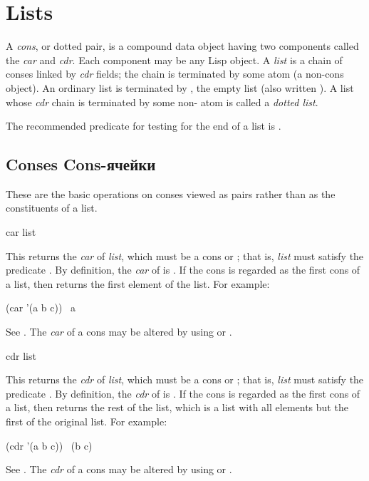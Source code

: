 
\clearpage\def\pagestatus{FINAL PROOF}

\ifx \rulang\Undef

\chapter{Lists}

A \emph{cons}, or dotted pair, is a compound data object having two components
called the \emph{car} and \emph{cdr}.  Each component may be any Lisp object.
A \emph{list} is a chain of conses
linked by \emph{cdr} fields; the chain is terminated by some atom
(a non-cons object).
An ordinary list is terminated by {\nil}, the empty list
(also written {\emptylist}).
A list whose \emph{cdr} chain is terminated by some non-{\nil} atom is called
a \emph{dotted list}.

The recommended predicate for testing for the end of a list is .

\section{Conses Cons-ячейки}

These are the basic operations on conses viewed as pairs rather than
as the constituents of a list.

\begin{defun}[Function]
car list

This returns the \emph{car} of \emph{list}, which must be a cons or {\emptylist};
that is, \emph{list} must satisfy the predicate .
By definition, the \emph{car} of {\emptylist} is {\emptylist}.
If the cons is regarded as the first cons of a list, then 
returns the first element of the list.
For example:
\begin{lisp}
(car '(a b c)) \EV\ a
\end{lisp}
See .
The \emph{car} of a cons may be altered by using  or .
\end{defun}

\begin{defun}[Function]
cdr list

This returns the \emph{cdr} of \emph{list}, which must be a cons or {\emptylist};
that is, \emph{list} must satisfy the predicate .
By definition, the \emph{cdr} of {\emptylist} is {\emptylist}.
If the cons is regarded as the first cons of a list, then 
returns the rest of the list, which is a list with all elements
but the first of the original list.
For example:
\begin{lisp}
(cdr '(a b c)) \EV\ (b c)
\end{lisp}
See .
The \emph{cdr} of a cons may be altered by using  or .
\end{defun}

